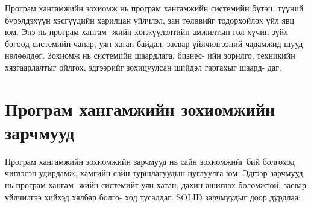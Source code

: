 Програм хангамжийн зохиомж нь програм хангамжийн системийн бүтэц, түүний бүрэлдэхүүн хэсгүүдийн харилцан үйлчлэл, зан төлөвийг тодорхойлох үйл явц юм. Энэ нь програм хангам- жийн хөгжүүлэлтийн амжилтын гол хүчин зүйл бөгөөд системийн чанар, уян хатан байдал, засвар үйлчилгээний чадамжид шууд нөлөөлдөг. Зохиомж нь системийн шаардлага, бизнес- ийн зорилго, техникийн хязгаарлалтыг ойлгох, эдгээрийг зохицуулсан шийдэл гаргахыг шаард- даг.
\section{Програм хангамжийн зохиомжийн зарчмууд}
Програм хангамжийн зохиомжийн зарчмууд нь сайн зохиомжийг бий болгоход чиглэсэн удирдамж, хамгийн сайн туршлагуудын цуглуулга юм. Эдгээр зарчмууд нь програм хангам- жийн системийг уян хатан, дахин ашиглах боломжтой, засвар үйлчилгээ хийхэд хялбар болго- ход тусалдаг. SOLID зарчмуудыг доор дурдлаа:
